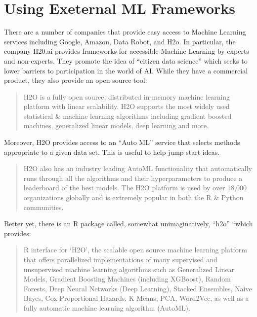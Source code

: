 \documentclass[
]{book}
\begin{document}
\hypertarget{using-exeternal-ml-frameworks}{%
\chapter{Using Exeternal ML Frameworks}\label{using-exeternal-ml-frameworks}}

There are a number of companies that provide easy access to Machine Learning services including Google, Amazon, Data Robot, and H2o. In particular, the company H20.ai provides frameworks for accessible Machine Learning by experts and non-experts. They promote the idea of ``citizen data science'' which seeks to lower barriers to participation in the world of AI. While they have a commercial product, they also provide an open source tool:

\begin{quote}
H2O is a fully open source, distributed in-memory machine learning platform with linear
scalability. H2O supports the most widely used statistical \& machine learning algorithms
including gradient boosted machines, generalized linear models, deep learning and more.
\end{quote}

Moreover, H2O provides access to an ``Auto ML'' service that selects methods appropriate to a given data set. This is useful to help jump start ideas.

\begin{quote}
H2O also has an industry leading AutoML functionality that automatically runs through
all the algorithms and their hyperparameters to produce a leaderboard of the best models.
The H2O platform is used by over 18,000 organizations globally and is extremely popular
in both the R \& Python communities.
\end{quote}

Better yet, there is an R package called, somewhat unimaginatively, ``h2o'' ``which provides:

\begin{quote}
R interface for `H2O', the scalable open source machine learning platform that offers
parallelized implementations of many supervised and unsupervised machine learning algorithms
such as Generalized Linear Models, Gradient Boosting Machines (including XGBoost), Random
Forests, Deep Neural Networks (Deep Learning), Stacked Ensembles, Naive Bayes, Cox
Proportional Hazards, K-Means, PCA, Word2Vec, as well as a fully automatic machine learning
algorithm (AutoML).
\end{quote}
\end{document}
